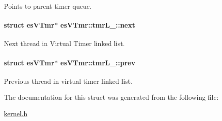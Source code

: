 Points to parent timer queue. 

\hypertarget{structesVTmr_1_1tmrL___aecec9d50fcf431357a3d03428a56f97c}{
\paragraph[{next}]{\setlength{\rightskip}{0pt plus 5cm}struct {\bf es\-V\-Tmr}$\ast$ es\-V\-Tmr\-::tmr\-L\-\_\-\-::next}}\label{structesVTmr_1_1tmrL___aecec9d50fcf431357a3d03428a56f97c}


Next thread in Virtual Timer linked list. 

\hypertarget{structesVTmr_1_1tmrL___af796db79ea86f16a9c976f0546e0dee5}{
\paragraph[{prev}]{\setlength{\rightskip}{0pt plus 5cm}struct {\bf es\-V\-Tmr}$\ast$ es\-V\-Tmr\-::tmr\-L\-\_\-\-::prev}}\label{structesVTmr_1_1tmrL___af796db79ea86f16a9c976f0546e0dee5}


Previous thread in virtual timer linked list. 



The documentation for this struct was generated from the following file\-:\begin{DoxyCompactItemize}
\item 
\hyperlink{kernel_8h}{kernel.\-h}\end{DoxyCompactItemize}
